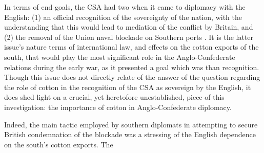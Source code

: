 In terms of end goals, the CSA had two when it came to diplomacy with the English: (1) an official recognition of the sovereignty of the nation, with the
understanding that this would lead to mediation of the conflict by Britain, and (2) the removal of the Union naval blockade on Southern ports
\Autocites()()[][pp. 383]{mcphersonBattleCry1988}[W.L. Yancey and A. Dudley Mann to Secretary of State R. Toombs, July 15, 1861, in:][pp. 45]{davismessagespapers1966}.
It is the latter issue's nature terms of international law, and effects on the cotton exports of the south, that would play the most significant role in
the Anglo-Confederate relations during the early war, as it presented a goal which was  than
recognition\autocite[John Slidell to Secretary of State R.M.T. Hunter, September 26, 1862, in:][pp. 187]{davismessagespapers1966}. Though this issue does not
directly relate of the answer of the question regarding the role of cotton in the recognition of the CSA as sovereign by the English, it does shed light on a 
crucial, yet heretofore unestablished, piece of this investigation: the importance of cotton in Anglo-Confederate diplomacy. 

Indeed, the main tactic employed by southern diplomats in attempting to secure British condemnation of the blockade was a stressing of the English dependence 
on the south's cotton exports. The 